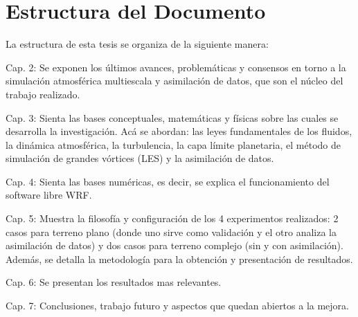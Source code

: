 \section{Estructura del Documento}
La estructura de esta tesis se organiza de la siguiente manera:
\begin{itemize*}
	\item Cap. 2: Se exponen los últimos avances, problemáticas y consensos en torno a la simulación atmosférica multiescala y asimilación de datos, que son el núcleo del trabajo realizado.
	\item Cap. 3: Sienta las bases conceptuales, matemáticas y físicas sobre las cuales se desarrolla la investigación. Acá se abordan: las leyes fundamentales de los fluidos, la dinámica atmosférica, la turbulencia, la capa límite planetaria, el método de simulación de grandes vórtices (LES) y la asimilación de datos.
	\item Cap. 4: Sienta las bases numéricas, es decir, se explica el funcionamiento del software  libre WRF.
	\item Cap. 5: Muestra la filosofía y configuración de los 4 experimentos realizados: 2 casos para terreno plano (donde uno sirve como validación y el otro analiza la asimilación de datos) y dos casos para terreno complejo (sin y con asimilación). Además, se detalla la metodología para la obtención y presentación de resultados.
	\item Cap. 6: Se presentan los resultados mas relevantes.
	\item Cap. 7: Conclusiones, trabajo futuro y aspectos que quedan abiertos a la mejora.
\end{itemize*}
